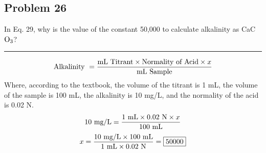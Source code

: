 \subsection*{Problem 26}
In Eq. 29, why is the value of the constant 50,000 to calculate alkalinity as CaC\(\textnormal{O}_3\)?\\
\rule{5cm}{1pt}
\[\textnormal{Alkalinity }=\frac{\textnormal{mL Titrant}\times\textnormal{Normality of Acid}\times x}{\textnormal{mL Sample}}\]
Where, according to the textbook, the volume of the titrant is 1 mL, the volume of the sample is 100 mL, the alkalinity is 10 mg/L, and the normality of the acid is 0.02 N.
\[\textnormal{10 mg/L}=\frac{1\textnormal{ mL}\times 0.02\textnormal{ N}\times x}{\textnormal{100 mL}}\]
\[x=\frac{\textnormal{10 mg/L}\times\textnormal{100 mL}}{1\textnormal{ mL}\times 0.02\textnormal{ N}}=\boxed{50000}\]